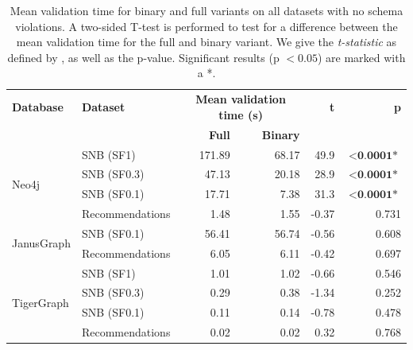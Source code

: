 \documentclass{report}
\theoremstyle{definition}
\begin{document}
\begin{table}[p]
  \centering
  \begin{tabular}{llrrrr}
    \hline
    \textbf{Database}           & \textbf{Dataset} & \multicolumn{2}{c}{\textbf{Mean validation time (s)}} & \textbf{t}      & \textbf{p}                                \\
                                &                  & \textbf{Full}                                         & \textbf{Binary} &            &                              \\
    \hline
    \multirow{4}{*}{Neo4j}      & SNB (SF1)        & 171.89                                                & 68.17           & 49.9       & $\mathbf{<}\textbf{0.0001*}$ \\
                                & SNB (SF0.3)      & 47.13                                                 & 20.18           & 28.9       & $\mathbf{<}\textbf{0.0001*}$ \\
                                & SNB (SF0.1)      & 17.71                                                 & 7.38            & 31.3       & $\mathbf{<}\textbf{0.0001*}$ \\
                                & Recommendations  & 1.48                                                  & 1.55            & -0.37      & 0.731                        \\
    \hline
    \multirow{2}{*}{JanusGraph} & SNB (SF0.1)      & 56.41                                                 & 56.74           & -0.56      & 0.608                        \\
                                & Recommendations  & 6.05                                                  & 6.11            & -0.42      & 0.697                        \\
    \hline
    \multirow{4}{*}{TigerGraph} & SNB (SF1)        & 1.01                                                  & 1.02            & -0.66      & 0.546                        \\
                                & SNB (SF0.3)      & 0.29                                                  & 0.38            & -1.34      & 0.252                        \\
                                & SNB (SF0.1)      & 0.11                                                  & 0.14            & -0.78      & 0.478                        \\
                                & Recommendations  & 0.02                                                  & 0.02            & 0.32       & 0.768                        \\
    \hline
  \end{tabular}
  \caption[Mean validation time for binary and full variants]{Mean validation time for binary and full variants on all datasets with no schema violations. A two-sided T-test is performed to test for a difference between the mean validation time for the full and binary variant. We give the \emph{t-statistic} as defined by \citet{student1908probable}, as well as the p-value. Significant results (p $< 0.05$) are marked with a *.}
  \label{tab:results-variant}
\end{table}
\end{document}
